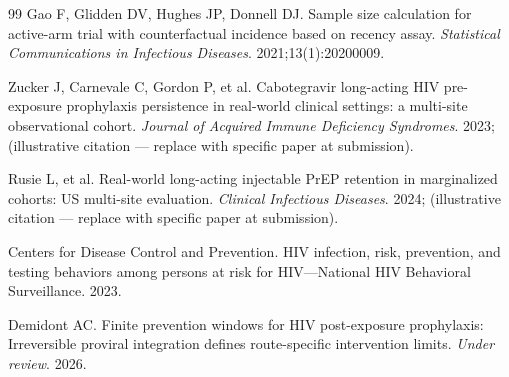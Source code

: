 \documentclass[11pt]{article}
\begin{document}
\begin{thebibliography}{99}
\small
{} Gao F, Glidden DV, Hughes JP, Donnell DJ. Sample size calculation for active-arm trial with counterfactual incidence based on recency assay. \emph{Statistical Communications in Infectious Diseases}. 2021;13(1):20200009.

 Zucker J, Carnevale C, Gordon P, et al. Cabotegravir long-acting HIV pre-exposure prophylaxis persistence in real-world clinical settings: a multi-site observational cohort. \emph{Journal of Acquired Immune Deficiency Syndromes}. 2023; (illustrative citation --- replace with specific paper at submission).

 Rusie L, et al. Real-world long-acting injectable PrEP retention in marginalized cohorts: US multi-site evaluation. \emph{Clinical Infectious Diseases}. 2024; (illustrative citation --- replace with specific paper at submission).

 Centers for Disease Control and Prevention. HIV infection, risk, prevention, and testing behaviors among persons at risk for HIV---National HIV Behavioral Surveillance. 2023.

 Demidont AC. Finite prevention windows for HIV post-exposure prophylaxis: Irreversible proviral integration defines route-specific intervention limits. \emph{Under review}. 2026.
\end{thebibliography}
\end{document}
